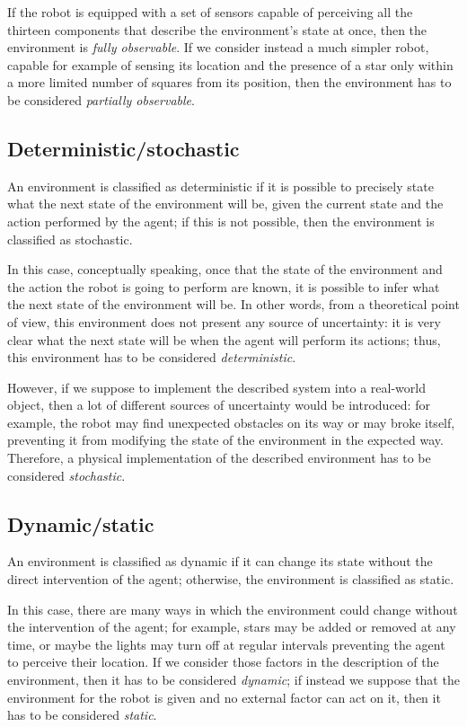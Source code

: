 \documentclass[letterpaper,headings=standardclasses]{scrartcl}
\begin{document}
If the robot is equipped with a set of sensors capable of perceiving all the thirteen components that describe the environment's state at once, then the environment is \emph{fully observable}. If we consider instead a much simpler robot, capable for example of sensing its location and the presence of a star only within a more limited number of squares from its position, then the environment has to be considered \emph{partially observable}.

\subsection{Deterministic/stochastic}

An environment is classified as deterministic if it is possible to precisely state what the next state of the environment will be, given the current state and the action performed by the agent; if this is not possible, then the environment is classified as stochastic.

In this case, conceptually speaking, once that the state of the environment and the action the robot is going to perform are known, it is possible to infer what the next state of the environment will be. In other words, from a theoretical point of view, this environment does not present any source of uncertainty: it is very clear what the next state will be when the agent will perform its actions; thus, this environment has to be considered \emph{deterministic}.

However, if we suppose to implement the described system into a real-world object, then a lot of different sources of uncertainty would be introduced: for example, the robot may find unexpected obstacles on its way or may broke itself, preventing it from modifying the state of the environment in the expected way. Therefore, a physical implementation of the described environment has to be considered \emph{stochastic}.

\subsection{Dynamic/static}

An environment is classified as dynamic if it can change its state without the direct intervention of the agent; otherwise, the environment is classified as static.

In this case, there are many ways in which the environment could change without the intervention of the agent; for example, stars may be added or removed at any time, or maybe the lights may turn off at regular intervals preventing the agent to perceive their location. If we consider those factors in the description of the environment, then it has to be considered \emph{dynamic}; if instead we suppose that the environment for the robot is given and no external factor can act on it, then it has to be considered \emph{static}.
\end{document}
